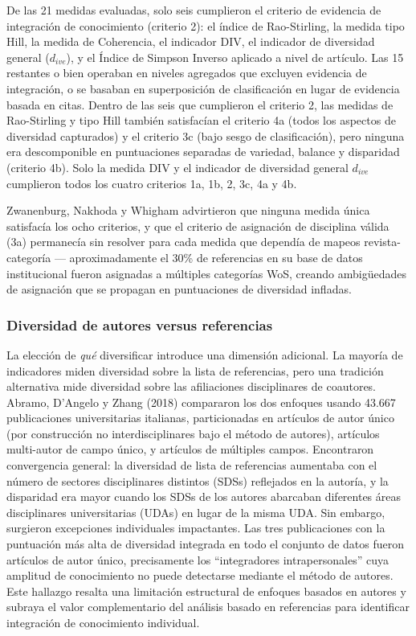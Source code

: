 \documentclass[
]{article}
\begin{document}
De las 21 medidas evaluadas, solo seis cumplieron el criterio de
evidencia de integración de conocimiento (criterio 2): el índice de
Rao-Stirling, la medida tipo Hill, la medida de Coherencia, el indicador
DIV, el indicador de diversidad general (\(d_{ive}\)), y el Índice de
Simpson Inverso aplicado a nivel de artículo. Las 15 restantes o bien
operaban en niveles agregados que excluyen evidencia de integración, o
se basaban en superposición de clasificación en lugar de evidencia
basada en citas. Dentro de las seis que cumplieron el criterio 2, las
medidas de Rao-Stirling y tipo Hill también satisfacían el criterio 4a
(todos los aspectos de diversidad capturados) y el criterio 3c (bajo
sesgo de clasificación), pero ninguna era descomponible en puntuaciones
separadas de variedad, balance y disparidad (criterio 4b). Solo la
medida DIV y el indicador de diversidad general \(d_{ive}\) cumplieron
todos los cuatro criterios 1a, 1b, 2, 3c, 4a y 4b.

Zwanenburg, Nakhoda y Whigham advirtieron que ninguna medida única
satisfacía los ocho criterios, y que el criterio de asignación de
disciplina válida (3a) permanecía sin resolver para cada medida que
dependía de mapeos revista-categoría --- aproximadamente el 30\% de
referencias en su base de datos institucional fueron asignadas a
múltiples categorías WoS, creando ambigüedades de asignación que se
propagan en puntuaciones de diversidad infladas.

\hypertarget{diversidad-de-autores-versus-referencias}{%
\subsubsection{Diversidad de autores versus
referencias}\label{diversidad-de-autores-versus-referencias}}

La elección de \emph{qué} diversificar introduce una dimensión
adicional. La mayoría de indicadores miden diversidad sobre la lista de
referencias, pero una tradición alternativa mide diversidad sobre las
afiliaciones disciplinares de coautores. Abramo, D'Angelo y Zhang (2018)
compararon los dos enfoques usando 43.667 publicaciones universitarias
italianas, particionadas en artículos de autor único (por construcción
no interdisciplinares bajo el método de autores), artículos multi-autor
de campo único, y artículos de múltiples campos. Encontraron
convergencia general: la diversidad de lista de referencias aumentaba
con el número de sectores disciplinares distintos (SDSs) reflejados en
la autoría, y la disparidad era mayor cuando los SDSs de los autores
abarcaban diferentes áreas disciplinares universitarias (UDAs) en lugar
de la misma UDA. Sin embargo, surgieron excepciones individuales
impactantes. Las tres publicaciones con la puntuación más alta de
diversidad integrada en todo el conjunto de datos fueron artículos de
autor único, precisamente los ``integradores intrapersonales'' cuya
amplitud de conocimiento no puede detectarse mediante el método de
autores. Este hallazgo resalta una limitación estructural de enfoques
basados en autores y subraya el valor complementario del análisis basado
en referencias para identificar integración de conocimiento individual.
\end{document}
